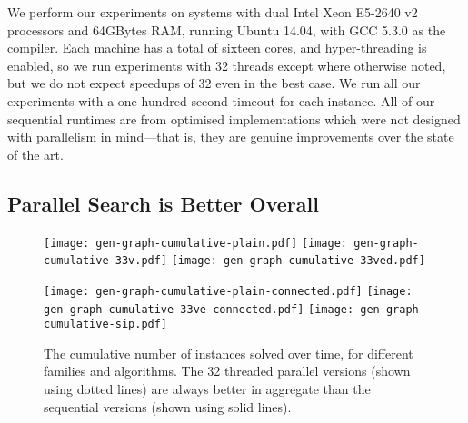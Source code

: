 \documentclass[sigconf]{acmart}
\begin{document}
We perform our experiments on systems with dual Intel Xeon E5-2640 v2 processors and 64GBytes RAM,
running Ubuntu 14.04, with GCC 5.3.0 as the compiler. Each machine has a total of sixteen cores, and
hyper-threading is enabled, so we run experiments with 32 threads except where otherwise noted, but
we do not expect speedups of 32 even in the best case.  We run all our experiments with a one
hundred second timeout for each instance. All of our sequential runtimes are from optimised
implementations which were not designed with parallelism in mind---that is, they are genuine
improvements over the state of the art.

\subsection{Parallel Search is Better Overall}

\begin{figure*}[p]
    \texttt{[image: gen-graph-cumulative-plain.pdf]}
    \hfill
    \texttt{[image: gen-graph-cumulative-33v.pdf]}
    \hfill
    \texttt{[image: gen-graph-cumulative-33ved.pdf]}

    \vspace*{1em}

    \texttt{[image: gen-graph-cumulative-plain-connected.pdf]}
    \hfill
    \texttt{[image: gen-graph-cumulative-33ve-connected.pdf]}
    \hfill
    \texttt{[image: gen-graph-cumulative-sip.pdf]}

    \caption{The cumulative number of instances solved over time, for different families and
    algorithms. The 32 threaded parallel versions (shown using dotted lines) are always better in
aggregate than the sequential versions (shown using solid lines).}\label{figure:cumulative}
\end{figure*}
\end{document}
